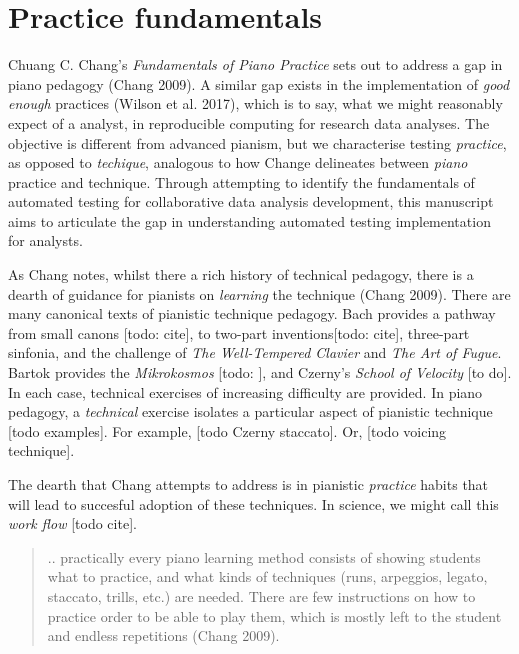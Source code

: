 \documentclass[
]{article}
\begin{document}
\hypertarget{practice-fundamentals}{%
\section{Practice fundamentals}\label{practice-fundamentals}}

Chuang C. Chang's \emph{Fundamentals of Piano Practice} sets out to
address a gap in piano pedagogy (Chang 2009). A similar gap exists in
the implementation of \emph{good enough} practices (Wilson et al. 2017),
which is to say, what we might reasonably expect of a analyst, in
reproducible computing for research data analyses. The objective is
different from advanced pianism, but we characterise testing
\emph{practice}, as opposed to \emph{techique}, analogous to how Change
delineates between \emph{piano} practice and technique. Through
attempting to identify the fundamentals of automated testing for
collaborative data analysis development, this manuscript aims to
articulate the gap in understanding automated testing implementation for
analysts.

As Chang notes, whilst there a rich history of technical pedagogy, there
is a dearth of guidance for pianists on \emph{learning} the technique
(Chang 2009). There are many canonical texts of pianistic technique
pedagogy. Bach provides a pathway from small canons {[}todo: cite{]}, to
two-part inventions{[}todo: cite{]}, three-part sinfonia, and the
challenge of \emph{The Well-Tempered Clavier} and \emph{The Art of
Fugue}. Bartok provides the \emph{Mikrokosmos} {[}todo: {]}, and
Czerny's \emph{School of Velocity} {[}to do{]}. In each case, technical
exercises of increasing difficulty are provided. In piano pedagogy, a
\emph{technical} exercise isolates a particular aspect of pianistic
technique {[}todo examples{]}. For example, {[}todo Czerny staccato{]}.
Or, {[}todo voicing technique{]}.

The dearth that Chang attempts to address is in pianistic
\emph{practice} habits that will lead to succesful adoption of these
techniques. In science, we might call this \emph{work flow} {[}todo
cite{]}.

\begin{quote}
.. practically every piano learning method consists of showing students
what to practice, and what kinds of techniques (runs, arpeggios, legato,
staccato, trills, etc.) are needed. There are few instructions on how to
practice order to be able to play them, which is mostly left to the
student and endless repetitions (Chang 2009).
\end{quote}
\end{document}
